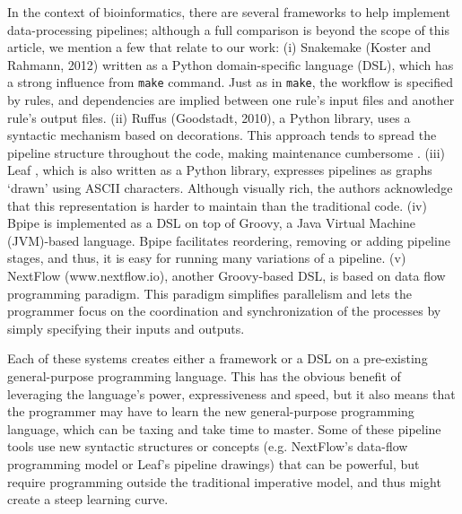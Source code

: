 In the context of bioinformatics, there are several frameworks to help implement data-processing pipelines; although a full comparison is beyond the scope of this article, we mention a few that relate to our work: (i) Snakemake (Koster and Rahmann, 2012) written as a Python domain-specific language (DSL), which has a strong influence from \texttt{make} command. Just as in \texttt{make}, the workflow is specified by rules, and dependencies are implied between one rule’s input files and another rule’s output files. (ii) Ruffus (Goodstadt, 2010), a Python library, uses a syntactic mechanism based on decorations. This approach tends to spread the pipeline structure throughout the code, making maintenance cumbersome \cite{Sadedin2012}. (iii) Leaf \cite{Napolitano2013}, which is also written as a Python library, expresses pipelines as graphs ‘drawn’ using ASCII characters. Although visually rich, the authors acknowledge that this representation is harder to maintain than the traditional code. (iv) Bpipe \cite{Sadedin2012} is implemented as a DSL on top of Groovy, a Java Virtual Machine (JVM)-based language. Bpipe facilitates reordering, removing or adding pipeline stages, and thus, it is easy for running many variations of a pipeline. (v) NextFlow (www.nextflow.io), another Groovy-based DSL, is based on data flow programming paradigm. This paradigm simplifies parallelism and lets the programmer focus on the coordination and synchronization of the processes by simply specifying their inputs and outputs.

Each of these systems creates either a framework or a DSL on a pre-existing general-purpose programming language. This has the obvious benefit of leveraging the language’s power, expressiveness and speed, but it also means that the programmer may have to learn the new general-purpose programming language, which can be taxing and take time to master. Some of these pipeline tools use new syntactic structures or concepts (e.g. NextFlow’s data-flow programming model or Leaf’s pipeline drawings) that can be powerful, but require programming outside the traditional imperative model, and thus might create a steep learning curve.

